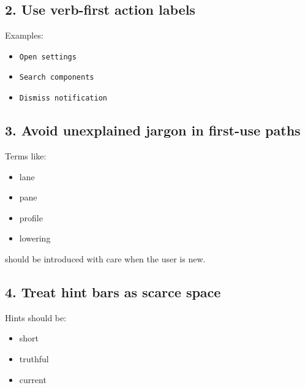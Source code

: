 \subsection{2. Use verb-first action labels}\label{record-040-use-verb-first-action-labels}

Examples:

\begin{itemize}
\tightlist
\item
  \texttt{O\allowbreak{}p\allowbreak{}e\allowbreak{}n\allowbreak{} \allowbreak{}s\allowbreak{}e\allowbreak{}t\allowbreak{}t\allowbreak{}i\allowbreak{}n\allowbreak{}g\allowbreak{}s}
\item
  \texttt{S\allowbreak{}e\allowbreak{}a\allowbreak{}r\allowbreak{}c\allowbreak{}h\allowbreak{} \allowbreak{}c\allowbreak{}o\allowbreak{}m\allowbreak{}p\allowbreak{}o\allowbreak{}n\allowbreak{}e\allowbreak{}n\allowbreak{}t\allowbreak{}s}
\item
  \texttt{D\allowbreak{}i\allowbreak{}s\allowbreak{}m\allowbreak{}i\allowbreak{}s\allowbreak{}s\allowbreak{} \allowbreak{}n\allowbreak{}o\allowbreak{}t\allowbreak{}i\allowbreak{}f\allowbreak{}i\allowbreak{}c\allowbreak{}a\allowbreak{}t\allowbreak{}i\allowbreak{}o\allowbreak{}n}
\end{itemize}

\subsection{3. Avoid unexplained jargon in first-use paths}\label{record-040-avoid-unexplained-jargon-in-first-use-paths}

Terms like:

\begin{itemize}
\tightlist
\item
  lane
\item
  pane
\item
  profile
\item
  lowering
\end{itemize}

should be introduced with care when the user is new.

\subsection{4. Treat hint bars as scarce space}\label{record-040-treat-hint-bars-as-scarce-space}

Hints should be:

\begin{itemize}
\tightlist
\item
  short
\item
  truthful
\item
  current
\end{itemize}

